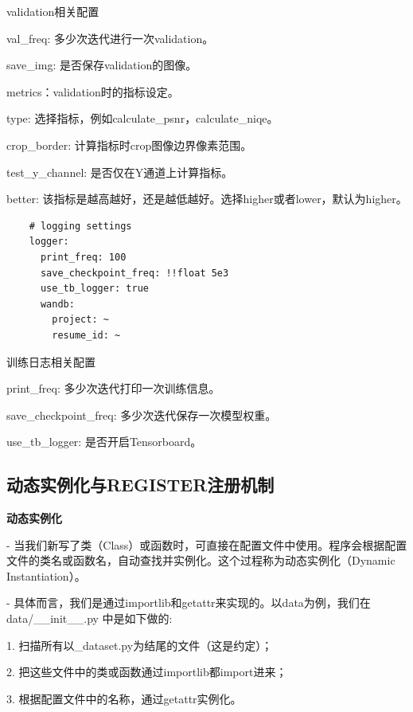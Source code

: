 \documentclass[../main.tex]{subfiles}
\begin{document}
	\begin{exampleBox}[righthand ratio=0.00, sidebyside, sidebyside align=center, lower separated=false]{validation相关配置}
	
	val\_freq: 多少次迭代进行一次validation。
	
    save\_img: 是否保存validation的图像。
    
    metrics：validation时的指标设定。
    
    type: 选择指标，例如calculate\_psnr，calculate\_niqe。
    
    crop\_border: 计算指标时crop图像边界像素范围。
    
    test\_y\_channel: 是否仅在Y通道上计算指标。
    
    better: 该指标是越高越好，还是越低越好。选择higher或者lower，默认为higher。
    \end{exampleBox}
    \begin{verbatim}
    # logging settings
    logger:
      print_freq: 100
      save_checkpoint_freq: !!float 5e3
      use_tb_logger: true
      wandb:
        project: ~
        resume_id: ~
	\end{verbatim}
	\begin{exampleBox}[righthand ratio=0.00, sidebyside, sidebyside align=center, lower separated=false]{训练日志相关配置}
	
	print\_freq: 多少次迭代打印一次训练信息。
    
    save\_checkpoint\_freq: 多少次迭代保存一次模型权重。
    
    use\_tb\_logger: 是否开启Tensorboard。
    \end{exampleBox}
    
    \subsection{动态实例化与REGISTER注册机制}
	\textbf{动态实例化}
	
	- 当我们新写了类（Class）或函数时，可直接在配置文件中使用。程序会根据配置文件的类名或函数名，自动查找并实例化。这个过程称为动态实例化（Dynamic Instantiation）。
	
	- 具体而言，我们是通过importlib和getattr来实现的。以data为例，我们在data/\_\_init\_\_.py 中是如下做的:

    1. 扫描所有以\_dataset.py为结尾的文件（这是约定）；
    
    2. 把这些文件中的类或函数通过importlib都import进来；
    
    3. 根据配置文件中的名称，通过getattr实例化。
    
\end{document}
